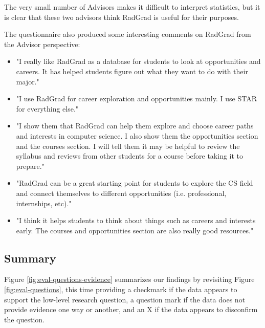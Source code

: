 \documentclass[acmsmall,nonacm]{acmart}
\begin{document}
The very small number of Advisors makes it difficult to interpret statistics, but it is clear that these two advisors think RadGrad is useful for their purposes.

The questionnaire also produced some interesting comments on RadGrad from the Advisor perspective:

\begin{itemize}[leftmargin=*]
\item "I really like RadGrad as a database for students to look at opportunities and careers. It has helped students figure out what they want to do with their major."
\item "I use RadGrad for career exploration and opportunities mainly. I use STAR for everything else."
\item "I show them that RadGrad can help them explore and choose career paths and interests in computer science. I also show them the opportunities section and the courses section. I will tell them it may be helpful to review the syllabus and reviews from other students for a course before taking it to prepare."
\item "RadGrad can be a great starting point for students to explore the CS field and connect themselves to different opportunities (i.e. professional, internships, etc)."
\item "I think it helps students to think about things such as careers and interests early. The courses and opportunities section are also really good resources."
\end{itemize}


\subsection{Summary}

Figure \ref{fig:eval-questions-evidence} summarizes our findings by revisiting Figure \ref{fig:eval-questions}, this time providing a checkmark if the data appears to support the low-level research question, a question mark if the data does not provide evidence one way or another, and an X if the data appears to disconfirm the question.
\end{document}
